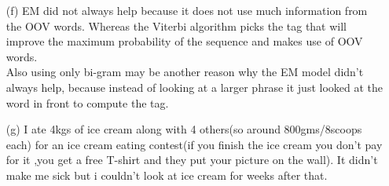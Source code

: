 \documentclass{article}
\begin{document}
\begin{enumerate}
\begin{enumerate}
    \item[(f)] EM did not always help because it does not use much information from the OOV words. Whereas the Viterbi algorithm picks the tag that will improve the maximum probability of the sequence and makes use of OOV words.
    \\Also using only bi-gram may be another reason why the EM model didn't always help, because instead of looking at a larger phrase it just looked at the word in front to compute the tag.
    \item[(g)] I ate 4kgs of ice cream along with 4 others(so around 800gms/8scoops each) for an ice cream eating contest(if you finish the ice cream you don't pay for it ,you get a free T-shirt and they put your picture on the wall). It didn't make me sick but i couldn't look at ice cream for weeks after that.
\end{enumerate}
\end{enumerate}
\end{document}
